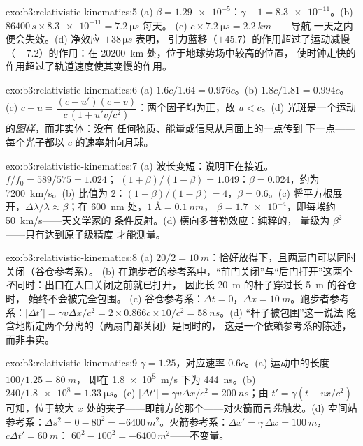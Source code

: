\begin{solution}{exo:b3:relativistic-kinematics:5}
(a) $\beta = \num{1.29e-5}$：$\gamma - 1 = \num{8.3e-11}$。(b)
$86400\,\unit{s} \times \num{8.3e-11} = \qty{7.2}{\micro s}$ 每天。
(c) $c \times \qty{7.2}{\micro s} = \qty{2.2}{km}$——导航
一天之内便会失效。(d) 净效应 $+38\,\unit{\micro s}$ 表明，
引力蓝移（$+45.7$）的作用超过了运动减慢（
$-7.2$）的作用：在 \qty{20200}{km} 处，位于地球势场中较高的位置，
使时钟走快的作用超过了轨道速度使其变慢的作用。
\end{solution}

\begin{solution}{exo:b3:relativistic-kinematics:6}
(a) $1.6c/1.64 = 0.976c$。(b) $1.8c/1.81 = 0.994c$。(c) $c - u =
\dfrac{(c - u')(c - v)}{c\,(1 + u'v/c^2)}$：两个因子均为正，故
$u < c$。(d) 光斑是一个运动的\emph{图样}，而非实体：没有
任何物质、能量或信息从月面上的一点传到
下一点——每个光子都以 $c$ 的速率射向月球。
\end{solution}

\begin{solution}{exo:b3:relativistic-kinematics:7}
(a) 波长变短：说明正在接近。$f/f_0 = 589/575 = 1.024$；
$(1+\beta)/(1-\beta) = 1.049$：$\beta = 0.024$，约为
\qty{7200}{km/s}。(b) 比值为 $2$：$(1+\beta)/(1-\beta) = 4$，$\beta =
0.6$。(c) 将平方根展开，$\Delta\lambda/\lambda \approx
\beta$；在 \qty{600}{nm} 处，$\qty{1}{\angstrom} = \qty{0.1}{nm}$，
$\beta = \num{1.7e-4}$，即每埃约 \qty{50}{km/s}——天文学家的
条件反射。(d) 横向多普勒效应：纯粹的，
量级为 $\beta^2$——只有达到原子级精度
才能测量。
\end{solution}

\begin{solution}{exo:b3:relativistic-kinematics:8}
(a) $20/2 = \qty{10}{m}$：恰好放得下，且两扇门可以同时关闭（谷仓参考系）。
(b) 在跑步者的参考系中，“前门关闭”与“后门打开”这两个
\emph{不}同时：出口在入口关闭之前就已打开，
因此长 \qty{20}{m} 的杆子穿过长 \qty{5}{m} 的谷仓时，
始终不会被完全包围。
(c) 谷仓参考系：$\Delta t = 0$，$\Delta x =
\qty{10}{m}$。跑步者参考系：$|\Delta t'| = \gamma v\Delta x/c^2 =
2 \times 0.866c \times 10/c^2 = \qty{58}{ns}$。(d) “杆子被包围”这一说法
隐含地断定两个分离的（两扇门都关闭）是同时的，
这是一个依赖参考系的陈述，而非事实。
\end{solution}

\begin{solution}{exo:b3:relativistic-kinematics:9}
$\gamma = 1.25$，对应速率 $0.6c$。(a) 运动中的长度 $100/1.25 = \qty{80}{m}$，
即在 \qty{1.8e8}{m/s} 下为 \qty{444}{ns}。(b) $240/\num{1.8e8} =
\qty{1.33}{\micro s}$。(c) $|\Delta t'| = \gamma v\Delta x/c^2 =
\qty{200}{ns}$；由 $t' = \gamma(t - vx/c^2)$ 可知，位于较大
$x$ 处的夹子——即前方的那个——对火箭而言\emph{先}触发。(d)
空间站参考系：$\Delta s^2 = 0 - 80^2 = -6400\,\unit{m^2}$。火箭参考系：$\Delta
x' = \gamma\,\Delta x = \qty{100}{m}$，$c\Delta t' = \qty{60}{m}$：
$60^2 - 100^2 = -6400\,\unit{m^2}$——不变量。
\end{solution}

